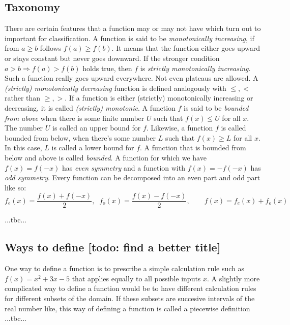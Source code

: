 
\subsection{Taxonomy}
There are certain features that a function may or may not have which turn out to important for classification. A function is said to be \emph{monotonically increasing}, if from $a \geq b$ follows $f(a) \geq f(b)$. It means that the function either goes upward or stays constant but never goes downward. If the stronger condition  $a > b \Rightarrow f(a) > f(b)$ holds true, then $f$ is \emph{strictly monotonically increasing}. Such a function really goes upward everywhere. Not even plateaus are allowed. A \emph{(strictly) monotonically decreasing} function is defined analogously with $\leq, <$ rather than $\geq, >$. If a function is either (strictly) monotonically increasing or decreasing, it is called \emph{(strictly) monotonic}. A function $f$ is said to be \emph{bounded from above} when there is some finite number $U$ such that $f(x) \leq U$ for all $x$. The number $U$ is called an upper bound for $f$. Likewise, a function $f$ is called bounded from below, when there's some number $L$ such that $f(x) \geq L$ for all $x$. In this case, $L$ is called a lower bound for $f$. A function that is bounded from below and above is called \emph{bounded}. A function for which we have $f(x) = f(-x)$ has \emph{even symmetry} and a function with $f(x) = -f(-x)$ has \emph{odd symmetry}. Every function can be decomposed into an even part and odd part like so: 
\begin{equation}
\label{Eq:EvenOddFuncDecomp}
f_e(x) = \frac{f(x) + f(-x)}{2}, \;\;
f_o(x) = \frac{f(x) - f(-x)}{2}, \qquad
f(x) = f_e(x) + f_o(x)
\end{equation}



...tbc...



\subsection{Ways to define [todo: find a better title]}
One way to define a function is to prescribe a simple calculation rule such as $f(x) = x^2 + 3 x - 5$ that applies equally to all possible inputs $x$. A slightly more complicated way to define a function would be to have different calculation rules for different subsets of the domain. If these subsets are succesive intervals of the real number like, this way of defining a function is called a piecewise definition ...tbc...

